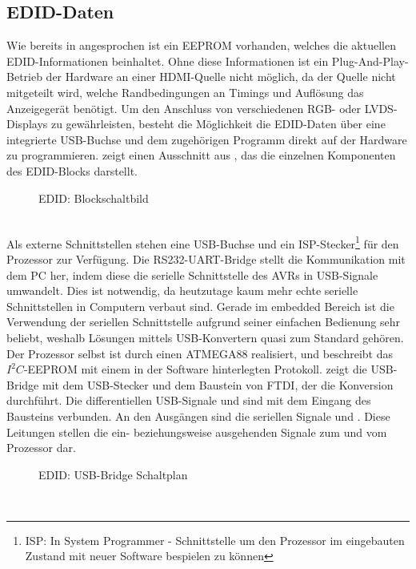 \subsection{EDID-Daten}
\label{cha:sw_edid_daten}
Wie bereits in  angesprochen ist ein EEPROM vorhanden, welches die aktuellen EDID-Informationen beinhaltet. Ohne diese Informationen ist ein Plug-And-Play-Betrieb der Hardware an einer HDMI-Quelle nicht möglich, da der Quelle nicht mitgeteilt wird, welche Randbedingungen an Timings und Auflösung das Anzeigegerät benötigt. Um den Anschluss von verschiedenen RGB- oder LVDS-Displays zu gewährleisten, besteht die Möglichkeit die EDID-Daten über eine integrierte USB-Buchse und dem zugehörigen Programm direkt auf der Hardware zu programmieren.  zeigt einen Ausschnitt aus , das die einzelnen Komponenten des EDID-Blocks darstellt. 
\begin{figure}[htp]
	\center
    \caption{EDID: Blockschaltbild}
    \label{fig:teilb_edid_blockschaltbild}
\end{figure}\\
Als externe Schnittstellen stehen eine USB-Buchse und ein ISP-Stecker\footnote{ISP: In System Programmer - Schnittstelle um den Prozessor im eingebauten Zustand mit neuer Software bespielen zu können} für den Prozessor zur Verfügung. Die RS232-UART-Bridge stellt die Kommunikation mit dem PC her, indem diese die serielle Schnittstelle des AVRs in USB-Signale umwandelt. Dies ist notwendig, da heutzutage kaum mehr echte serielle Schnittstellen in Computern verbaut sind. Gerade im embedded Bereich ist die Verwendung der seriellen Schnittstelle aufgrund seiner einfachen Bedienung sehr beliebt, weshalb Lösungen mittels USB-Konvertern quasi zum Standard gehören. Der Prozessor selbst ist durch einen ATMEGA88 realisiert, und beschreibt das $I^2C$-EEPROM mit einem in der Software hinterlegten Protokoll. 
 zeigt die USB-Bridge mit dem USB-Stecker und dem Baustein  von FTDI, der die Konversion durchführt. Die differentiellen USB-Signale  und  sind mit dem Eingang des Bausteins verbunden. An den Ausgängen sind die seriellen Signale  und . Diese Leitungen stellen die ein- beziehungsweise ausgehenden Signale zum und vom Prozessor dar.
\begin{figure}[htp]
	\center
    \caption{EDID: USB-Bridge Schaltplan}
    \label{fig:teilb_edid_usb_sch}
\end{figure}\\
